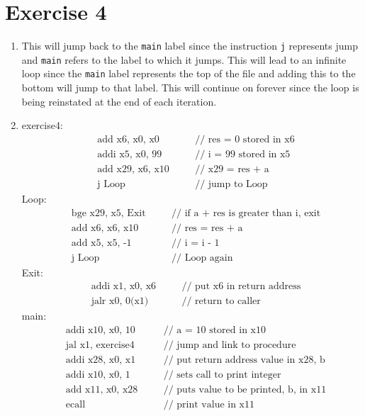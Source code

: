 \documentclass[12pt]{article}
\begin{document}
    \section*{Exercise 4}
    \begin{enumerate}
        \item
            This will jump back to the \verb+main+ label since the instruction \verb+j+ represents jump and \verb+main+ refers to the label to which it jumps. This will lead to an infinite loop since the \verb+main+ label represents the top of the file and adding this to the bottom will jump to that label. This will continue on forever since the loop is being reinstated at the end of each iteration.
        \item
            exercise4:
            \begin{align*}
                &\text{add x6, x0, x0}\quad &&\text{// res = 0 stored in x6} \\
                &\text{addi x5, x0, 99}\quad &&\text{// i = 99 stored in x5} \\
                &\text{add x29, x6, x10}\quad &&\text{// x29 = res + a} \\
                &\text{j Loop}\quad &&\text{// jump to Loop}
            \end{align*}
            Loop:
            \begin{align*}
                &\text{bge x29, x5, Exit}\quad &&\text{// if a + res is greater than i, exit} \\
                &\text{add x6, x6, x10}\quad &&\text{// res = res + a} \\
                &\text{add x5, x5, -1}\quad &&\text{// i = i - 1} \\
                &\text{j Loop}\quad &&\text{// Loop again}
            \end{align*}
            Exit:
            \begin{align*}
                &\text{addi x1, x0, x6}\quad &&\text{// put x6 in return address} \\
                &\text{jalr x0, 0(x1)}\quad &&\text{// return to caller}
            \end{align*}
            main:
            \begin{align*}
                &\text{addi x10, x0, 10}\quad &&\text{// a = 10 stored in x10} \\
                &\text{jal x1, exercise4}\quad &&\text{// jump and link to procedure} \\
                &\text{addi x28, x0, x1}\quad &&\text{// put return address value in x28, b} \\
                &\text{addi x10, x0, 1}\quad &&\text{// sets call to print integer} \\
                &\text{add x11, x0, x28}\quad &&\text{// puts value to be printed, b, in x11} \\
                &\text{ecall}\quad &&\text{// print value in x11}
            \end{align*}
    \end{enumerate}
\end{document}
